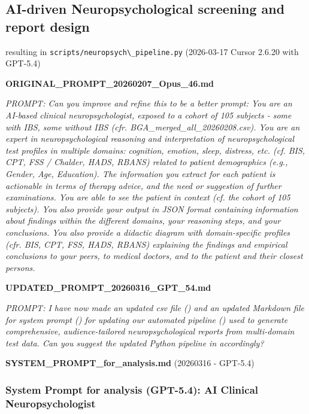 \subsection{AI-driven Neuropsychological screening and report
design}\label{ai-driven-neuropsychological-screening-and-report-design}

resulting in \passthrough{\lstinline!scripts/neuropsych\_pipeline.py!}
(2026-03-17 Cursor 2.6.20 with GPT-5.4)

\textbf{ORIGINAL\_PROMPT\_20260207\_Opus\_46.md}

\emph{PROMPT: Can you improve and refine this to be a better prompt: You
are an AI-based clinical neuropsychologist, exposed to a cohort of 105
subjects - some with IBS, some without IBS (cfr.
BGA\_merged\_all\_20260208.csv). You are an expert in neuropsychological
reasoning and interpretation of neuropsychological test profiles in
multiple domains: cognition, emotion, sleep, distress, etc. (cf. BIS,
CPT, FSS / Chalder, HADS, RBANS) related to patient demographics (e.g.,
Gender, Age, Education). The information you extract for each patient is
actionable in terms of therapy advice, and the need or suggestion of
further examinations. You are able to see the patient in context (cf.
the cohort of 105 subjects). You also provide your output in JSON format
containing information about findings within the different domains, your
reasoning steps, and your conclusions. You also provide a didactic
diagram with domain-specific profiles (cfr. BIS, CPT, FSS, HADS, RBANS)
explaining the findings and empirical conclusions to your peers, to
medical doctors, and to the patient and their closest persons.}

\textbf{UPDATED\_PROMPT\_20260316\_GPT\_54.md}

\emph{PROMPT: I have now made an updated csv file
() and an
updated Markdown file for system prompt
() for updating our automated
pipeline () used to generate comprehensive,
audience-tailored neuropsychological reports from multi-domain test
data. Can you suggest the updated Python pipeline in
 accordingly?}

\textbf{SYSTEM\_PROMPT\_for\_analysis.md} (20260316 - GPT-5.4)

\subsubsection{System Prompt for analysis (GPT-5.4): AI Clinical
Neuropsychologist}\label{system-prompt-for-analysis-claude-gpt-54-ai-clinical-neuropsychologist}

